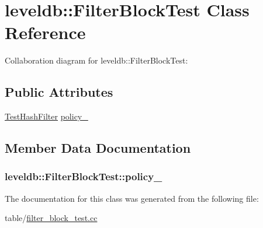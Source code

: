 \hypertarget{classleveldb_1_1_filter_block_test}{\section{leveldb\-:\-:Filter\-Block\-Test Class Reference}
\label{classleveldb_1_1_filter_block_test}
}


Collaboration diagram for leveldb\-:\-:Filter\-Block\-Test\-:
\subsection*{Public Attributes}
\begin{DoxyCompactItemize}
\item 
\hyperlink{classleveldb_1_1_test_hash_filter}{Test\-Hash\-Filter} \hyperlink{classleveldb_1_1_filter_block_test_ae52fe0fab92f8efc0c078b117cf43e67}{policy\-\_\-}
\end{DoxyCompactItemize}


\subsection{Member Data Documentation}
\hypertarget{classleveldb_1_1_filter_block_test_ae52fe0fab92f8efc0c078b117cf43e67}{
\subsubsection[{policy\-\_\-}]{ leveldb\-::\-Filter\-Block\-Test\-::policy\-\_\-}}\label{classleveldb_1_1_filter_block_test_ae52fe0fab92f8efc0c078b117cf43e67}


The documentation for this class was generated from the following file\-:\begin{DoxyCompactItemize}
\item 
table/\hyperlink{filter__block__test_8cc}{filter\-\_\-block\-\_\-test.\-cc}\end{DoxyCompactItemize}
